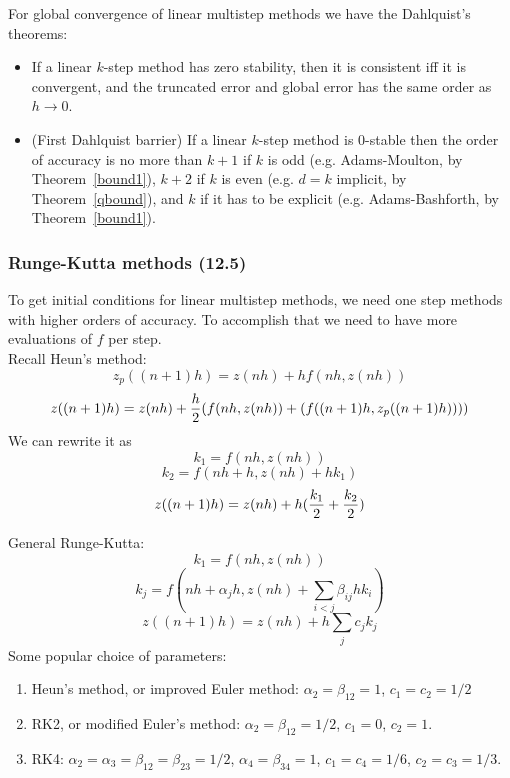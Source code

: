 \documentclass[20pt]{article} %
\theoremstyle{break}
\begin{document}
\newpage

For global convergence of linear multistep methods we have the Dahlquist's theorems:
\begin{itemize}
\item If a linear $k$-step method has zero stability, then it is consistent iff it is convergent, and the truncated error and global error has the same order as $h\rightarrow 0$.
\item (First Dahlquist barrier) If a linear $k$-step method is 0-stable then the order of accuracy is no more than $k+1$ if $k$ is odd (e.g. Adams-Moulton, by Theorem~\ref{bound1}), $k+2$ if $k$ is even (e.g. $d=k$ implicit, by Theorem~\ref{qbound}), and $k$ if it has to be explicit (e.g. Adams-Bashforth, by Theorem~\ref{bound1}).
\end{itemize}

\newpage

\subsubsection{Runge-Kutta methods (12.5)}

To get initial conditions for linear multistep methods, we need one step methods with higher orders of accuracy. To accomplish that we need to have more evaluations of $f$ per step.\\

Recall Heun's method:
\[z_p((n+1)h)=z(nh)+hf(nh, z(nh))\]
\[z((n+1)h)=z(nh)+{h\over 2}(f(nh, z(nh))+(f((n+1)h, z_p((n+1)h))))\]
We can rewrite it as
\[k_1=f(nh, z(nh))\]
\[k_2=f(nh+h, z(nh)+hk_1)\]
\[z((n+1)h)=z(nh)+h({k_1\over 2}+{k_2\over 2})\]

\newpage
General Runge-Kutta:
\[k_1=f(nh, z(nh))\]
\[k_j=f(nh+\alpha_jh, z(nh)+\sum_{i<j}\beta_{ij}hk_i)\]
\[z((n+1)h)=z(nh)+h\sum_jc_jk_j\]
Some popular choice of parameters:
\begin{enumerate}
\item Heun's method, or improved Euler method: $\alpha_2=\beta_{12}=1$, $c_1=c_2=1/2$
\item RK2, or modified Euler's method: $\alpha_2=\beta_{12}=1/2$, $c_1=0$, $c_2=1$.
\item RK4: $\alpha_2=\alpha_3=\beta_{12}=\beta_{23}=1/2$, $\alpha_4=\beta_{34}=1$, $c_1=c_4=1/6$, $c_2=c_3=1/3$.   
\end{enumerate}

\newpage
\end{document}

